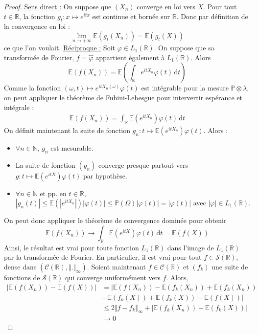   \begin{proof}
    \uline{Sens direct :} On suppose que $(X_n)$ converge en loi vers $X$. Pour tout $t \in \mathbb{R}$, la fonction $g_t : x \mapsto e^{itx}$ est continue et bornée sur $\mathbb{R}$. Donc par définition de la convergence en loi :
    \[ \lim_{n \rightarrow +\infty} \mathbb{E}(g_t(X_n)) = \mathbb{E}(g_t(X)) \]
    ce que l'on voulait.
    \newpar
    \uline{Réciproque :} Soit $\varphi \in L_1(\mathbb{R})$. On suppose que sa transformée de Fourier, $f = \widehat{\varphi}$ appartient également à $L_1(\mathbb{R})$. Alors
    \[ \mathbb{E}(f(X_n)) = \mathbb{E} \left ( \int_{\mathbb{R}} e^{itX_n} \varphi(t) \, \mathrm{d}t \right ) \]
    Comme la fonction $(\omega, t) \mapsto e^{itX_n(\omega)} \varphi(t)$ est intégrable pour la mesure $\mathbb{P} \otimes \lambda$, on peut appliquer le théorème de Fubini-Lebesgue pour intervertir espérance et intégrale :
    \begin{align*}
      \mathbb{E}(f(X_n)) = \int_{\mathbb{R}} \mathbb{E} (e^{itX_n}) \varphi(t) \, \mathrm{d}t
    \end{align*}
    On définit maintenant la suite de fonction $g_n : t \mapsto \mathbb{E} (e^{itX_n}) \varphi(t)$. Alors :
    \begin{itemize}
      \item $\forall n \in \mathbb{N}$, $g_n$ est mesurable.
      \item La suite de fonction $(g_n)$ converge presque partout vers $g : t \mapsto \mathbb{E} (e^{itX}) \varphi(t)$ par hypothèse.
      \item $\forall n \in \mathbb{N}$ et pp. en $t \in \mathbb{R}$, $|g_n(t)| \leq \mathbb{E} (|e^{itX_n}|) |\varphi(t)| \leq \mathbb{P}(\Omega) |\varphi(t)| = |\varphi(t)|$ avec $|\varphi| \in L_1(\mathbb{R})$.
    \end{itemize}
    On peut donc appliquer le théorème de convergence dominée pour obtenir
    \[ \mathbb{E}(f(X_n)) \longrightarrow \int_{\mathbb{R}} \mathbb{E} (e^{itX}) \varphi(t) \, \mathrm{d}t = \mathbb{E}(f(X)) \]
    Ainsi, le résultat est vrai pour toute fonction $L_1(\mathbb{R})$ dans l'image de $L_1(\mathbb{R})$ par la transformée de Fourier. En particulier, il est vrai pour tout $f \in \mathcal{S}(\mathbb{R})$, dense dans $(\mathcal{C}(\mathbb{R}), \Vert . \Vert_\infty)$. Soient maintenant $f \in \mathcal{C}(\mathbb{R})$ et $(f_k)$ une suite de fonctions de $\mathcal{S}(\mathbb{R})$ qui converge uniformément vers $f$. Alors,
    \begin{align*}
      |\mathbb{E}(f(X_n)) - \mathbb{E}(f(X))| &= |\mathbb{E}(f(X_n)) - \mathbb{E}(f_k(X_n)) + \mathbb{E}(f_k(X_n)) \\
      &- \mathbb{E}(f_k(X)) + \mathbb{E}(f_k(X)) - \mathbb{E}(f(X))| \\
      &\leq 2 \Vert f - f_k \Vert_\infty + |\mathbb{E}(f_k(X_n)) - \mathbb{E}(f_k(X))| \\
      &\longrightarrow 0
    \end{align*}
  \end{proof}

